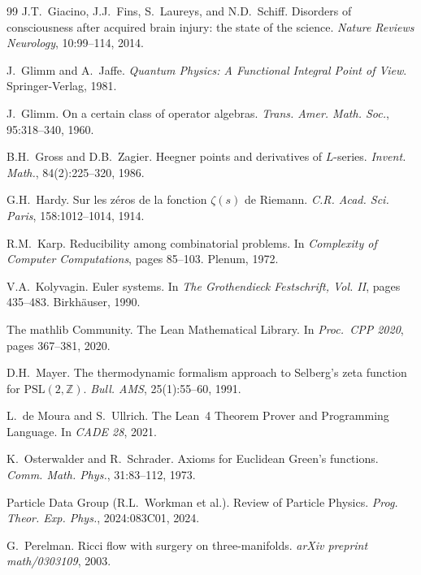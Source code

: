 \documentclass[11pt,a4paper]{amsart}
\theoremstyle{plain}
\theoremstyle{definition}
\begin{document}
\begin{thebibliography}{99}
J.T.~Giacino, J.J.~Fins, S.~Laureys, and N.D.~Schiff.
\newblock Disorders of consciousness after acquired brain injury: the state of the science.
\newblock \emph{Nature Reviews Neurology}, 10:99--114, 2014.

J.~Glimm and A.~Jaffe.
\newblock \emph{Quantum Physics: A Functional Integral Point of View}.
\newblock Springer-Verlag, 1981.

J.~Glimm.
\newblock On a certain class of operator algebras.
\newblock \emph{Trans. Amer. Math. Soc.}, 95:318--340, 1960.

B.H.~Gross and D.B.~Zagier.
\newblock Heegner points and derivatives of $L$-series.
\newblock \emph{Invent. Math.}, 84(2):225--320, 1986.

G.H.~Hardy.
\newblock Sur les z\'eros de la fonction $\zeta(s)$ de Riemann.
\newblock \emph{C.R. Acad. Sci. Paris}, 158:1012--1014, 1914.

R.M.~Karp.
\newblock Reducibility among combinatorial problems.
\newblock In \emph{Complexity of Computer Computations}, pages 85--103. Plenum, 1972.

V.A.~Kolyvagin.
\newblock Euler systems.
\newblock In \emph{The Grothendieck Festschrift, Vol. II}, pages 435--483. Birkh\"auser, 1990.

The mathlib Community.
\newblock The Lean Mathematical Library.
\newblock In \emph{Proc.\ CPP 2020}, pages 367--381, 2020.

D.H.~Mayer.
\newblock The thermodynamic formalism approach to Selberg's zeta function for $\mathrm{PSL}(2,\mathbb{Z})$.
\newblock \emph{Bull. AMS}, 25(1):55--60, 1991.

L.~de Moura and S.~Ullrich.
\newblock The Lean~4 Theorem Prover and Programming Language.
\newblock In \emph{CADE 28}, 2021.

K.~Osterwalder and R.~Schrader.
\newblock Axioms for Euclidean Green's functions.
\newblock \emph{Comm. Math. Phys.}, 31:83--112, 1973.

Particle Data Group (R.L.~Workman et al.).
\newblock Review of Particle Physics.
\newblock \emph{Prog. Theor. Exp. Phys.}, 2024:083C01, 2024.

G.~Perelman.
\newblock Ricci flow with surgery on three-manifolds.
\newblock \emph{arXiv preprint math/0303109}, 2003.


\end{thebibliography}
\end{document}
